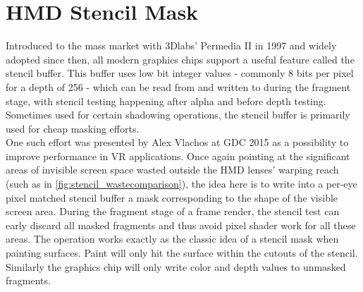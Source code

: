 
\section{HMD Stencil Mask} \label{stencilmask}
Introduced to the mass market with 3Dlabs' Permedia II in 1997 and widely adopted since then, all modern graphics chips support a  useful feature called the stencil buffer. This buffer uses low bit integer values - commonly 8 bits per pixel for a depth of 256 \cite{deVries.2014} - which can be read from and written to during the fragment stage, with stencil testing happening after alpha and before depth testing. Sometimes used for certain shadowing operations, the stencil buffer is primarily used for cheap masking efforts. \\
One such effort was presented by Alex Vlachos at GDC 2015 \cite{Vlachos.2015} as a possibility to improve performance in \gls{VR} applications. Once again pointing at the significant areas of invisible screen space wasted outside the HMD lenses' warping reach (such as in \autoref{fig:stencil_wastecomparison}), the idea here is to write into a per-eye pixel matched stencil buffer a mask corresponding to the shape of the visible screen area. During the fragment stage of a frame render, the stencil test can early discard all masked fragments and thus avoid pixel shader work for all these areas. The operation works exactly as the classic idea of a stencil mask when painting surfaces. Paint will only hit the surface within the cutouts of the stencil. Similarly the graphics chip will only write color and depth values to unmasked fragments. 


